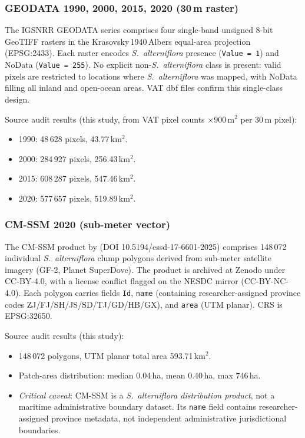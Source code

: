 \documentclass[11pt]{article}
\begin{document}
\subsubsection{GEODATA 1990, 2000, 2015, 2020 (30\,m raster)}

The IGSNRR GEODATA series comprises four single-band unsigned 8-bit GeoTIFF
rasters in the Krasovsky\,1940\,Albers equal-area projection (EPSG:2433).
Each raster encodes \textit{S.~alterniflora} presence (\texttt{Value = 1})
and NoData (\texttt{Value = 255}). No explicit non-\textit{S.~alterniflora}
class is present: valid pixels are restricted to locations where
\textit{S.~alterniflora} was mapped, with NoData filling all inland and open-ocean
areas. VAT dbf files confirm this single-class design.

Source audit results (this study, from VAT pixel counts $\times 900\,\text{m}^2$
per 30\,m pixel):
\begin{itemize}[nosep]
\item 1990: 48\,628 pixels, 43.77\,km$^2$.
\item 2000: 284\,927 pixels, 256.43\,km$^2$.
\item 2015: 608\,287 pixels, 547.46\,km$^2$.
\item 2020: 577\,657 pixels, 519.89\,km$^2$.
\end{itemize}

\subsubsection{CM-SSM 2020 (sub-meter vector)}

The CM-SSM product by \citet{xu_2025_cmssm} (DOI 10.5194/essd-17-6601-2025)
comprises 148\,072 individual \textit{S.~alterniflora} clump polygons derived
from sub-meter satellite imagery (GF-2, Planet SuperDove). The product is
archived at Zenodo under CC-BY-4.0, with a license conflict flagged on the
NESDC mirror (CC-BY-NC-4.0). Each polygon carries fields \texttt{Id},
\texttt{name} (containing researcher-assigned province codes ZJ/FJ/SH/JS/SD/TJ/GD/HB/GX),
and \texttt{area} (UTM planar). CRS is EPSG:32650.

Source audit results (this study):
\begin{itemize}[nosep]
\item 148\,072 polygons, UTM planar total area 593.71\,km$^2$.
\item Patch-area distribution: median 0.04\,ha, mean 0.40\,ha, max 746\,ha.
\item \emph{Critical caveat}: CM-SSM is a \textit{S.~alterniflora distribution
  product}, not a maritime administrative boundary dataset. Its \texttt{name}
  field contains researcher-assigned province metadata, not independent
  administrative jurisdictional boundaries.
\end{itemize}
\end{document}
